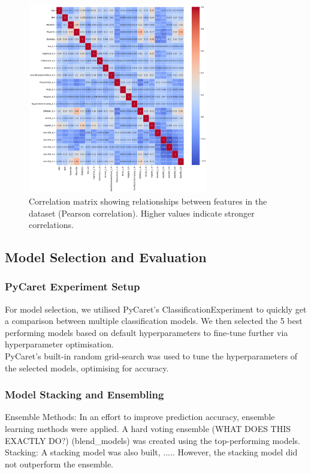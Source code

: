\documentclass[a4paper,12pt]{article}
\begin{document}
\begin{figure}[H]
    \centering
    \includegraphics[width=0.7\textwidth]{correlation_matrix.png}
    \caption{Correlation matrix showing relationships between features in the dataset (Pearson correlation). 
    Higher values indicate stronger correlations.}
    \label{fig:correlation_matrix}
\end{figure}

\subsection{Model Selection and Evaluation}
\subsubsection{PyCaret Experiment Setup}
For model selection, we utilised PyCaret's ClassificationExperiment to quickly get a 
comparison between multiple classification models. We then selected the 
5 best performing models based on default hyperparameters to fine-tune further via hyperparameter
optimisation.
\\
PyCaret’s built-in random grid-search was used to tune the hyperparameters of the selected models, 
optimising for accuracy.

\subsubsection{Model Stacking and Ensembling}
Ensemble Methods: In an effort to improve prediction accuracy, ensemble learning methods were applied. 
A hard voting ensemble (WHAT DOES THIS EXACTLY DO?) (blend\_models) was created using the 
top-performing models.
Stacking: A stacking model was also built, ..... 
However, the stacking model did not outperform the ensemble.
\end{document}
